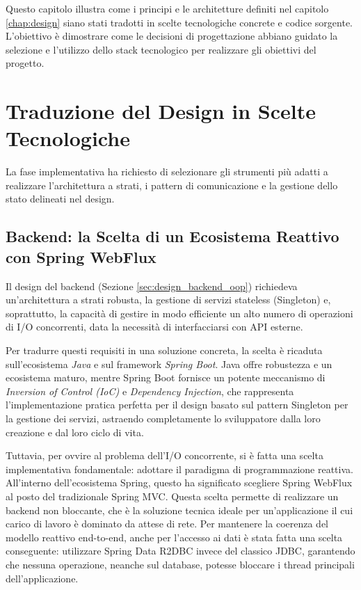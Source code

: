 \documentclass[12pt,a4paper,openright,twoside]{book}
\begin{document}
Questo capitolo illustra come i principi e le architetture definiti nel capitolo \ref{chap:design} siano stati tradotti in scelte tecnologiche concrete e codice sorgente. L'obiettivo è dimostrare come le decisioni di progettazione abbiano guidato la selezione e l'utilizzo dello stack tecnologico per realizzare gli obiettivi del progetto.

\section{Traduzione del Design in Scelte Tecnologiche}
\label{sec:impl_tech_choices}

La fase implementativa ha richiesto di selezionare gli strumenti più adatti a realizzare l'architettura a strati, i pattern di comunicazione e la gestione dello stato delineati nel design.

\subsection{Backend: la Scelta di un Ecosistema Reattivo con Spring WebFlux}
Il design del backend (Sezione \ref{sec:design_backend_oop}) richiedeva un'architettura a strati robusta, la gestione di servizi stateless (Singleton) e, soprattutto, la capacità di gestire in modo efficiente un alto numero di operazioni di I/O concorrenti, data la necessità di interfacciarsi con API esterne.

Per tradurre questi requisiti in una soluzione concreta, la scelta è ricaduta sull'ecosistema \textit{Java} e sul framework \textit{Spring Boot}. Java offre robustezza e un ecosistema maturo, mentre Spring Boot fornisce un potente meccanismo di \textit{Inversion of Control (IoC)} e \textit{Dependency Injection}, che rappresenta l'implementazione pratica perfetta per il design basato sul pattern Singleton per la gestione dei servizi, astraendo completamente lo sviluppatore dalla loro creazione e dal loro ciclo di vita.

Tuttavia, per ovvire al problema dell'I/O concorrente, si è fatta una scelta implementativa fondamentale: adottare il paradigma di programmazione reattiva. All'interno dell'ecosistema Spring, questo ha significato scegliere Spring WebFlux al posto del tradizionale Spring MVC. Questa scelta permette di realizzare un backend non bloccante, che è la soluzione tecnica ideale per un'applicazione il cui carico di lavoro è dominato da attese di rete. Per mantenere la coerenza del modello reattivo end-to-end, anche per l'accesso ai dati è stata fatta una scelta conseguente: utilizzare Spring Data R2DBC invece del classico JDBC, garantendo che nessuna operazione, neanche sul database, potesse bloccare i thread principali dell'applicazione.
\end{document}
